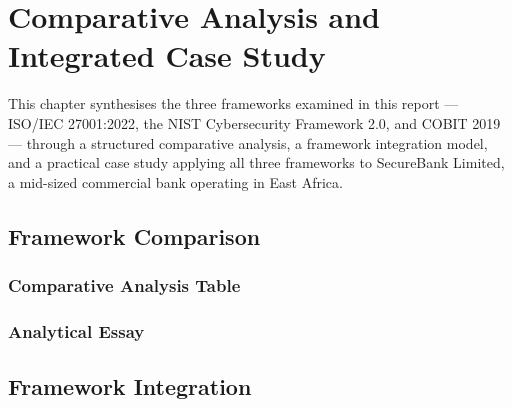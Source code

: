 
\chapter{Comparative Analysis and Integrated Case Study}

This chapter synthesises the three frameworks examined in this report --- ISO/IEC 27001:2022, the NIST Cybersecurity Framework 2.0, and COBIT 2019 --- through a structured comparative analysis, a framework integration model, and a practical case study applying all three frameworks to SecureBank Limited, a mid-sized commercial bank operating in East Africa.

\section{Framework Comparison}

\subsection{Comparative Analysis Table}



\subsection{Analytical Essay}



\section{Framework Integration}


